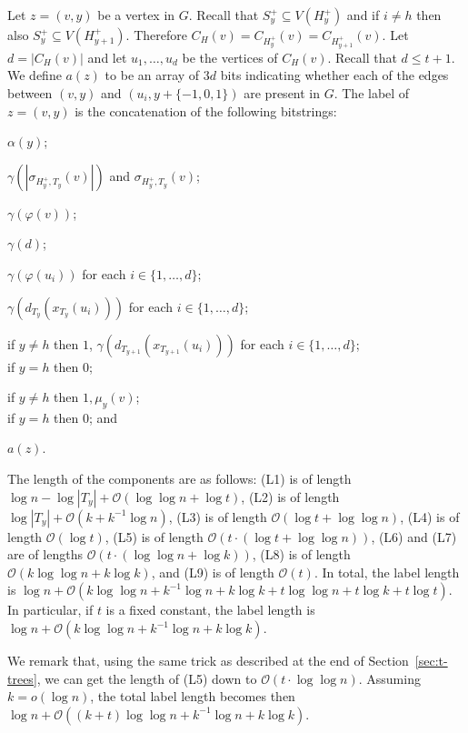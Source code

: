\documentclass[kpfonts]{patmorin}
\newcommand{\Oh}{\mathcal{O}}
\let\leq\leqslant
\begin{document}
Let $z=(v,y)$ be a vertex in $G$. 
Recall that $S^+_y \subseteq V(H^+_y)$ and if $i\neq h$ then also $S^+_y\subseteq V(H^+_{y+1})$. 
Therefore 
$C_{H}(v) = C_{H^+_y}(v) = C_{H^+_{y+1}}(v)$.
Let $d = |C_{H}(v)|$ and let $u_1,\dots,u_d$ be the vertices of $C_H(v)$. 
Recall that $d\leq t+1$.
We define $a(z)$ to be an array of $3d$ bits indicating whether 
each of the edges between $(v,y)$ and $(u_i,y+\{-1,0,1\})$ are present in $G$. 
The label of $z=(v,y)$ is the concatenation of the following bitstrings:

\begin{compactenum}[(L1)]
  \item\label{label-alpha} $\alpha(y)$;%
  \item $\gamma(|\sigma_{H^+_y,T_y}(v)|)$ and $\sigma_{H^+_y,T_y}(v)$; %
  \item $\gamma(\varphi(v))$;
  \item $\gamma(d)$;
  \item $\gamma(\varphi(u_i))$ for each $i\in\{1,\dots,d\}$;
  \item $\gamma(d_{T_{y}}(x_{T_{y}}(u_i)))$ for each $i\in\{1,\dots,d\}$;
  \item 
  if $y\neq h$ then $1$, $\gamma(d_{T_{y+1}}(x_{T_{y+1}}(u_i)))$ for each $i\in\{1,\dots,d\}$;\\
  if $y=h$ then $0$;  
  \item 
  if $y\neq h$ then $1,\mu_y(v)$;\\
  if $y=h$ then $0$; and
  \item $a(z)$.
  \end{compactenum}
The length of the components are as follows: 
(L1) is of length $\log n -\log|T_y| + \Oh(\log\log n + \log t)$, 
(L2) is of length $\log|T_y| + \Oh(k+k^{-1}\log n)$, 
(L3) is of length $\Oh(\log t + \log\log n)$,
(L4) is of length $\Oh(\log t)$, 
(L5) is of length $\Oh(t\cdot (\log t + \log\log n))$, 
(L6) and (L7) are of lengths $\Oh(t\cdot (\log\log n + \log k))$,
(L8) is of length $\Oh(k\log\log n + k\log k)$, and 
(L9) is of length $\Oh(t)$.
In total, the label length is $\log n + \Oh(k\log\log n+k^{-1}\log n + k\log k + t \log\log n + t \log k + t \log t)$. 
In particular, if $t$ is a fixed constant, the label length is $\log{n} + \Oh( k\log\log{n} + k^{-1}\log{n} + k\log k)$. 

We remark that, using the same trick as described at the end of Section~\ref{sec:t-trees}, we can get the length of (L5) down to $\Oh(t\cdot \log\log n)$. 
Assuming $k = o(\log{n})$, the total label length becomes then $\log{n} + \Oh((k+t)\log\log{n} + k^{-1}\log{n} + k\log k)$. 
\end{document}
